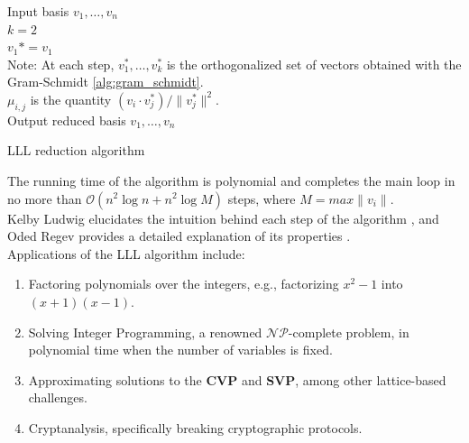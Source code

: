 \documentclass[a4paper,12pt]{report}
\begin{document}
\begin{algorithm}[H]
    \vspace*{5px}
    Input basis ${v_1, \ldots, v_n}$ \; \\
    $k = 2$ \; \\
    $v_1* = v_1$ \; \\
    Note: At each step, $v_1^*, \ldots, v_k^*$ is the orthogonalized set of vectors
    obtained with the Gram-Schmidt \ref{alg:gram_schmidt}. \\
    \vspace*{5px}
    $\mu_{i,j}$ is the quantity $(v_i \cdot v_j^*) / \lVert v_j^* \rVert^2$. \\
    Output reduced basis ${v_1, \ldots, v_n}$
    \caption{LLL reduction algorithm}
\end{algorithm}

The running time of the algorithm is polynomial and completes the main loop in no more than
$\mathcal{O}(n^2\log n + n^2\log M)$ steps, where $M = max \lVert v_i \rVert$. \\

Kelby Ludwig elucidates the intuition behind each step of the algorithm \cite{lllintuition}, and Oded Regev provides a detailed explanation of its properties \cite{lllexplanation}.\\

Applications of the LLL algorithm include:

\begin{enumerate}
    \item Factoring polynomials over the integers, e.g., factorizing $x^2 - 1$ into $(x + 1)(x - 1)$.
    \item Solving Integer Programming, a renowned $\mathcal{NP}$-complete problem, in polynomial time when the number of variables is fixed.
    \item Approximating solutions to the \textbf{CVP} and \textbf{SVP}, among other lattice-based challenges.
    \item Cryptanalysis, specifically breaking cryptographic protocols.
\end{enumerate}
\end{document}
